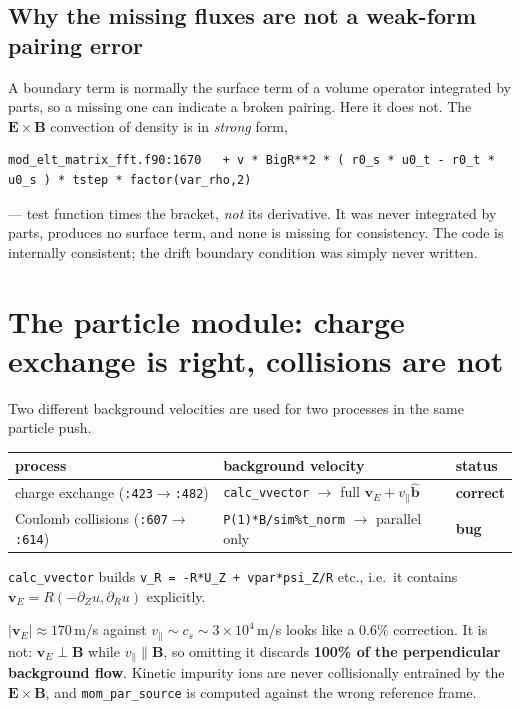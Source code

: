\documentclass[11pt,a4paper]{article}
\newcommand{\code}[1]{\texttt{\small #1}}
\newcommand{\vE}{\bm v_E}\newcommand{\nhat}{\hat{\bm n}}\newcommand{\that}{\hat{\bm t}}
\begin{document}
\subsection{Why the missing fluxes are not a weak-form pairing error}

A boundary term is normally the surface term of a volume operator integrated by parts, so a
missing one can indicate a broken pairing. Here it does not. The $\bm E\times\bm B$
convection of density is in \emph{strong} form,
\begin{lstlisting}
mod_elt_matrix_fft.f90:1670   + v * BigR**2 * ( r0_s * u0_t - r0_t * u0_s ) * tstep * factor(var_rho,2)
\end{lstlisting}
--- test function times the bracket, \emph{not} its derivative. It was never integrated by
parts, produces no surface term, and none is missing for consistency. The code is internally
consistent; the drift boundary condition was simply never written.

\section{The particle module: charge exchange is right, collisions are not}

Two different background velocities are used for two processes in the same particle push.

\begin{center}
\begin{tabular}{lll}
\toprule
process & background velocity & status \\
\midrule
charge exchange (\code{:423}$\to$\code{:482}) & \code{calc\_vvector} $\to$ full $\vE + v_\parallel\hat{\bm b}$ & \textbf{correct} \\
Coulomb collisions (\code{:607}$\to$\code{:614}) & \code{P(1)*B/sim\%t\_norm} $\to$ parallel only & \textbf{bug} \\
\bottomrule
\end{tabular}
\end{center}

\noindent\code{calc\_vvector} builds \code{v\_R = -R*U\_Z + vpar*psi\_Z/R} etc., i.e.\ it
contains $\vE = R(-\partial_Z u,\partial_R u)$ explicitly.

\begin{keybox}
$|\vE|\approx170$\,m/s against $v_\parallel\sim c_s\sim3\times10^4$\,m/s looks like a
$0.6\%$ correction. It is not: $\vE\perp\bm B$ while $v_\parallel\parallel\bm B$, so omitting
it discards \textbf{100\% of the perpendicular background flow}. Kinetic impurity ions are
never collisionally entrained by the $\bm E\times\bm B$, and \code{mom\_par\_source} is
computed against the wrong reference frame.
\end{keybox}
\end{document}
